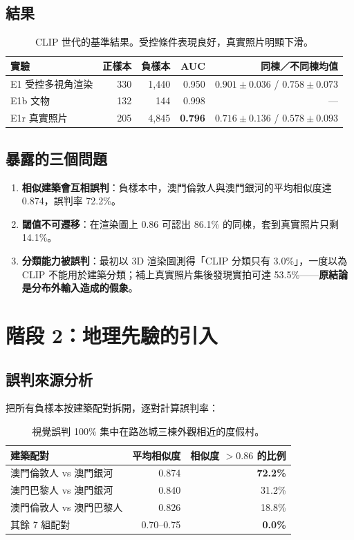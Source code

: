 \documentclass[11pt,a4paper,fontset=windows]{ctexart}
\begin{document}
\subsection{結果}
\begin{table}[H]
\centering\small
\begin{tabular}{@{}lrrrr@{}}
\toprule
\textbf{實驗} & \textbf{正樣本} & \textbf{負樣本} & \textbf{AUC} & \textbf{同棟／不同棟均值} \\
\midrule
E1 受控多視角渲染 & 330 & 1{,}440 & 0.950 & $0.901\pm0.036$ / $0.758\pm0.073$ \\
E1b 文物 & 132 & 144 & 0.998 & — \\
E1r 真實照片 & 205 & 4{,}845 & \textbf{0.796} & $0.716\pm0.136$ / $0.578\pm0.093$ \\
\bottomrule
\end{tabular}
\caption{CLIP 世代的基準結果。受控條件表現良好，真實照片明顯下滑。}
\end{table}

\subsection{暴露的三個問題}
\begin{enumerate}[leftmargin=1.4em,itemsep=2pt]
  \item \textbf{相似建築會互相誤判}：負樣本中，澳門倫敦人與澳門銀河的平均相似度達 0.874，誤判率 72.2\%。
  \item \textbf{閾值不可遷移}：在渲染圖上 0.86 可認出 86.1\% 的同棟，套到真實照片只剩 14.1\%。
  \item \textbf{分類能力被誤判}：最初以 3D 渲染圖測得「CLIP 分類只有 3.0\%」，一度以為 CLIP 不能用於建築分類；補上真實照片集後發現實拍可達 53.5\%——\textbf{原結論是分布外輸入造成的假象}。
\end{enumerate}

\section{階段 2：地理先驗的引入}

\subsection{誤判來源分析}
把所有負樣本按建築配對拆開，逐對計算誤判率：

\begin{table}[H]
\centering\small
\begin{tabular}{@{}lrr@{}}
\toprule
\textbf{建築配對} & \textbf{平均相似度} & \textbf{相似度 $>0.86$ 的比例} \\
\midrule
澳門倫敦人 vs 澳門銀河 & 0.874 & \textbf{72.2\%} \\
澳門巴黎人 vs 澳門銀河 & 0.840 & 31.2\% \\
澳門倫敦人 vs 澳門巴黎人 & 0.826 & 18.8\% \\
其餘 7 組配對 & 0.70--0.75 & \textbf{0.0\%} \\
\bottomrule
\end{tabular}
\caption{視覺誤判 100\% 集中在路氹城三棟外觀相近的度假村。}
\end{table}
\end{document}
